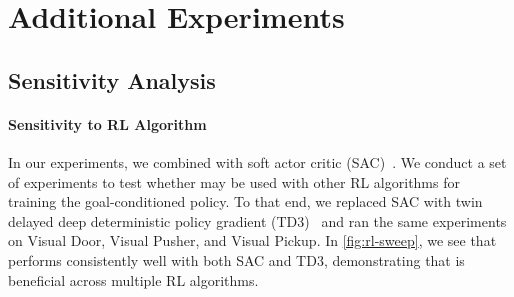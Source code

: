 

\section{Additional Experiments}\label{sec:add-exps}

\subsection{Sensitivity Analysis}\label{sensitivity}
\paragraph{Sensitivity to RL Algorithm}
In our experiments, we combined \METHOD with soft actor critic (SAC)~\citep{haarnoja2018sacapp}.
We conduct a set of experiments to test whether \METHOD may be used with other RL algorithms for training the goal-conditioned policy.
To that end, we replaced SAC with twin delayed deep deterministic policy gradient (TD3)~\citep{fujimoto2018td3} and ran the same \METHOD experiments on Visual Door, Visual Pusher, and Visual Pickup.
In \autoref{fig:rl-sweep}, we see that \METHOD performs consistently well with both SAC and TD3, demonstrating that \METHOD is beneficial across multiple RL algorithms.
